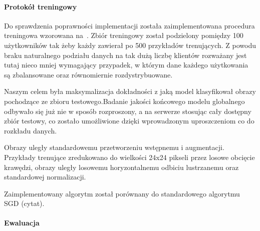   \paragraph{Protokół treningowy}

  Do sprawdzenia poprawności implementacji została zaimplementowana procedura treningowa wzorowana
  na~\cite{mcmahan2016communicationefficient}. Zbiór treningowy został podzielony pomiędzy 100 użytkowników tak żeby każdy zawierał po 500 przykładów trenujących. Z powodu braku naturalnego podziału danych na tak dużą liczbę klientów rozważany jest tutaj nieco mniej wymagający przypadek, w którym dane każdego użytkowania są zbalansowane oraz równomiernie rozdystrybuowane.

  Naszym celem była maksymalizacja dokładności z jaką model klasyfikował obrazy pochodzące ze
  zbioru testowego.Badanie jakości końcowego modelu globalnego odbywało się już nie w sposób
  rozproszony, a na serwerze stosując cały dostępny zbiór testowy, co zostało umożliwione dzięki wprowadzonym uproszczeniom co do rozkładu danych.

  Obrazy uległy standardowemu przetworzeniu wstępnemu i augmentacji. Przykłady trenujące zredukowano do wielkości 24x24 pikseli przez losowe obcięcie krawędzi, obrazy uległy losowemu horyzontalnemu odbiciu lustrzanemu  oraz standardowej normalizacji.

  Zaimplementowany algorytm został porównany do standardowego algorytmu SGD (cytat).


  \paragraph{Ewaluacja}